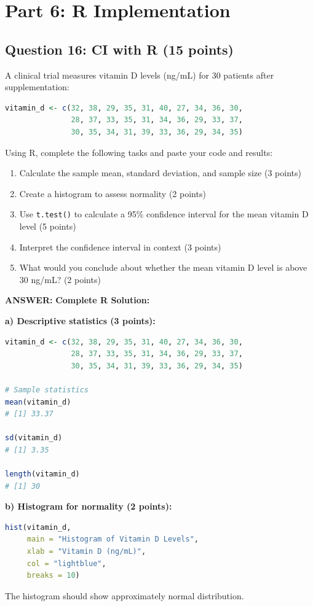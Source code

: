 \documentclass[11pt]{article}
\newcommand{\answer}[1]{\par\vspace{0.3em}\colorbox{green!10}{\parbox{\dimexpr\textwidth-2\fboxsep}{\textbf{ANSWER:} #1}}\vspace{0.3em}\par}
\begin{document}
\section*{Part 6: R Implementation}

\subsection*{Question 16: CI with R (15 points)}

A clinical trial measures vitamin D levels (ng/mL) for 30 patients after supplementation:

\begin{lstlisting}[language=R, basicstyle=\small\ttfamily]
vitamin_d <- c(32, 38, 29, 35, 31, 40, 27, 34, 36, 30,
               28, 37, 33, 35, 31, 34, 36, 29, 33, 37,
               30, 35, 34, 31, 39, 33, 36, 29, 34, 35)
\end{lstlisting}

Using R, complete the following tasks and paste your code and results:
\begin{enumerate}[label=\alph*)]
\item Calculate the sample mean, standard deviation, and sample size (3 points)
\item Create a histogram to assess normality (2 points)
\item Use \texttt{t.test()} to calculate a 95\% confidence interval for the mean vitamin D level (5 points)
\item Interpret the confidence interval in context (3 points)
\item What would you conclude about whether the mean vitamin D level is above 30 ng/mL? (2 points)
\end{enumerate}

\answer{\textbf{Complete R Solution:}}

\textbf{a) Descriptive statistics (3 points):}
\begin{lstlisting}[language=R, basicstyle=\small\ttfamily]
vitamin_d <- c(32, 38, 29, 35, 31, 40, 27, 34, 36, 30,
               28, 37, 33, 35, 31, 34, 36, 29, 33, 37,
               30, 35, 34, 31, 39, 33, 36, 29, 34, 35)

# Sample statistics
mean(vitamin_d)
# [1] 33.37

sd(vitamin_d)
# [1] 3.35

length(vitamin_d)
# [1] 30
\end{lstlisting}

\textbf{b) Histogram for normality (2 points):}
\begin{lstlisting}[language=R, basicstyle=\small\ttfamily]
hist(vitamin_d,
     main = "Histogram of Vitamin D Levels",
     xlab = "Vitamin D (ng/mL)",
     col = "lightblue",
     breaks = 10)
\end{lstlisting}
The histogram should show approximately normal distribution.
\end{document}
